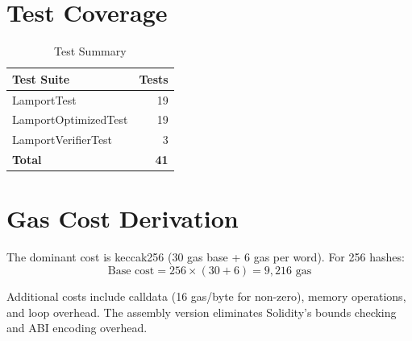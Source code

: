 \documentclass[11pt,a4paper]{article}
\begin{document}
\appendix

\section{Test Coverage}

\begin{table}[h]
\centering
\caption{Test Summary}
\begin{tabular}{@{}lr@{}}
\toprule
Test Suite & Tests \\
\midrule
LamportTest & 19 \\
LamportOptimizedTest & 19 \\
LamportVerifierTest & 3 \\
\midrule
\textbf{Total} & \textbf{41} \\
\bottomrule
\end{tabular}
\end{table}

\section{Gas Cost Derivation}

The dominant cost is keccak256 (30 gas base + 6 gas per word). For 256 hashes:
\[
\text{Base cost} = 256 \times (30 + 6) = 9,216 \text{ gas}
\]

Additional costs include calldata (16 gas/byte for non-zero), memory operations, and loop overhead. The assembly version eliminates Solidity's bounds checking and ABI encoding overhead.
\end{document}

